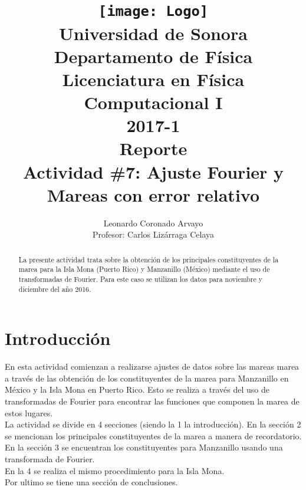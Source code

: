 \documentclass[12pt,letterpaper]{article}
\author{
Leonardo Coronado Arvayo\\
Profesor: Carlos Lizárraga Celaya   \vspace*{1.25in}}
\title{	\texttt{[image: Logo]} \\
Universidad de Sonora \\
{\small Departamento de Física \\
Licenciatura en Física \\
Computacional I \\
2017-1 \\
\vspace{0.55in} Reporte}\\ 
{\Huge Actividad \#7: Ajuste Fourier y Mareas con error relativo}\\
\vspace*{1.0in}}
\begin{document}
	\maketitle
\newpage
	\tableofcontents
\pagebreak

\begin{abstract}


La presente actividad trata sobre la obtención de los principales constituyentes de la marea para la Isla Mona (Puerto Rico) y Manzanillo (México) mediante el uso de transformadas de Fourier. Para este caso se utilizan los datos para noviembre y diciembre del año 2016.


\end{abstract}


\section{Introducción}

En esta actividad comienzan a realizarse ajustes de datos sobre las mareas marea a través de las obtención de los constituyentes de la marea para Manzanillo en México y la Isla Mona en Puerto Rico. 
Esto se realiza a través del uso de transformadas de Fourier para encontrar las funciones que componen la marea de estos lugares.\\


La actividad se divide en 4 secciones (siendo la 1 la introducción). En la sección 2 se mencionan los principales constituyentes de la marea a manera de recordatorio.\\
En la sección 3 se encuentran los constituyentes para Manzanillo usando una transformada de Fourier. \\
En la 4 se realiza el mismo procedimiento para la Isla Mona.\\
Por ultimo se tiene una sección de conclusiones.\\
\end{document}
